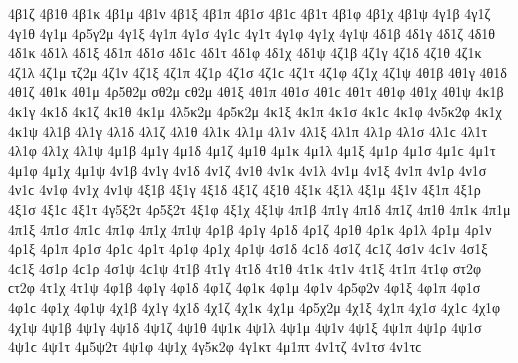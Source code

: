 {4β1ζ 
4β1θ 
4β1κ 
4β1μ 
4β1ν 
4β1ξ 
4β1π 
4β1σ 4β1ϲ 
4β1τ 
4β1φ 
4β1χ 
4β1ψ 
4γ1β 
4γ1ζ 
4γ1θ 
4γ1μ 
4ρ5γ2μ   %
4γ1ξ 
4γ1π 
4γ1σ 4γ1ϲ 
4γ1τ 
4γ1φ 
4γ1χ 
4γ1ψ 
4δ1β 
4δ1γ 
4δ1ζ 
4δ1θ 
4δ1κ 
4δ1λ 
4δ1ξ 
4δ1π 
4δ1σ 4δ1ϲ 
4δ1τ 
4δ1φ 
4δ1χ 
4δ1ψ 
4ζ1β   %
4ζ1γ   %
4ζ1δ 
4ζ1θ 
4ζ1κ 
4ζ1λ 
4ζ1μ 
τζ2μ   %
4ζ1ν 
4ζ1ξ 
4ζ1π 
4ζ1ρ 
4ζ1σ 4ζ1ϲ 
4ζ1τ 
4ζ1φ 
4ζ1χ 
4ζ1ψ 
4θ1β 
4θ1γ 
4θ1δ 
4θ1ζ 
4θ1κ 
4θ1μ 
4ρ5θ2μ   %
σθ2μ ϲθ2μ   %
4θ1ξ 
4θ1π 
4θ1σ 4θ1ϲ 
4θ1τ 
4θ1φ 
4θ1χ 
4θ1ψ 
4κ1β   %
4κ1γ 
4κ1δ 
4κ1ζ 
4κ1θ 
4κ1μ 
4λ5κ2μ   %
4ρ5κ2μ   %
4κ1ξ 
4κ1π 
4κ1σ 4κ1ϲ 
4κ1φ 
4ν5κ2φ   %
4κ1χ 
4κ1ψ 
4λ1β 
4λ1γ 
4λ1δ 
4λ1ζ 
4λ1θ 
4λ1κ 
4λ1μ 
4λ1ν 
4λ1ξ 
4λ1π 
4λ1ρ 
4λ1σ 4λ1ϲ 
4λ1τ 
4λ1φ 
4λ1χ 
4λ1ψ 
4μ1β 
4μ1γ 
4μ1δ 
4μ1ζ 
4μ1θ 
4μ1κ 
4μ1λ 
4μ1ξ 
4μ1ρ 
4μ1σ 4μ1ϲ 
4μ1τ 
4μ1φ 
4μ1χ 
4μ1ψ 
4ν1β 
4ν1γ 
4ν1δ 
4ν1ζ 
4ν1θ 
4ν1κ 
4ν1λ 
4ν1μ 
4ν1ξ 
4ν1π 
4ν1ρ 
4ν1σ 4ν1ϲ 
4ν1φ 
4ν1χ 
4ν1ψ 
4ξ1β 
4ξ1γ 
4ξ1δ 
4ξ1ζ 
4ξ1θ 
4ξ1κ 
4ξ1λ 
4ξ1μ 
4ξ1ν 
4ξ1π 
4ξ1ρ 
4ξ1σ 4ξ1ϲ 
4ξ1τ 
4γ5ξ2τ   %
4ρ5ξ2τ   %
4ξ1φ 
4ξ1χ 
4ξ1ψ 
4π1β 
4π1γ 
4π1δ 
4π1ζ 
4π1θ 
4π1κ 
4π1μ 
4π1ξ 
4π1σ 4π1ϲ 
4π1φ 
4π1χ 
4π1ψ 
4ρ1β 
4ρ1γ 
4ρ1δ 
4ρ1ζ 
4ρ1θ 
4ρ1κ 
4ρ1λ 
4ρ1μ 
4ρ1ν 
4ρ1ξ 
4ρ1π 
4ρ1σ 4ρ1ϲ 
4ρ1τ 
4ρ1φ 
4ρ1χ 
4ρ1ψ 
4σ1δ 4ϲ1δ   %
4σ1ζ 4ϲ1ζ 
4σ1ν 4ϲ1ν   %
4σ1ξ 4ϲ1ξ 
4σ1ρ 4ϲ1ρ 
4σ1ψ 4ϲ1ψ 
4τ1β 
4τ1γ 
4τ1δ 
4τ1θ 
4τ1κ 
4τ1ν 
4τ1ξ 
4τ1π 
4τ1φ 
στ2φ ϲτ2φ   %
4τ1χ 
4τ1ψ 
4φ1β 
4φ1γ 
4φ1δ 
4φ1ζ 
4φ1κ   %
4φ1μ 
4φ1ν 
4ρ5φ2ν   %
4φ1ξ 
4φ1π 
4φ1σ 4φ1ϲ 
4φ1χ 
4φ1ψ 
4χ1β 
4χ1γ 
4χ1δ 
4χ1ζ 
4χ1κ 
4χ1μ 
4ρ5χ2μ   %
4χ1ξ 
4χ1π 
4χ1σ 4χ1ϲ 
4χ1φ 
4χ1ψ 
4ψ1β 
4ψ1γ 
4ψ1δ 
4ψ1ζ 
4ψ1θ 
4ψ1κ 
4ψ1λ 
4ψ1μ 
4ψ1ν 
4ψ1ξ 
4ψ1π 
4ψ1ρ 
4ψ1σ 4ψ1ϲ 
4ψ1τ 
4μ5ψ2τ   %
4ψ1φ 
4ψ1χ 
4γ5κ2φ   %
4γ1κτ   %
4μ1πτ   %
4ν1τζ   %
4ν1τσ 4ν1τϲ   %
}
